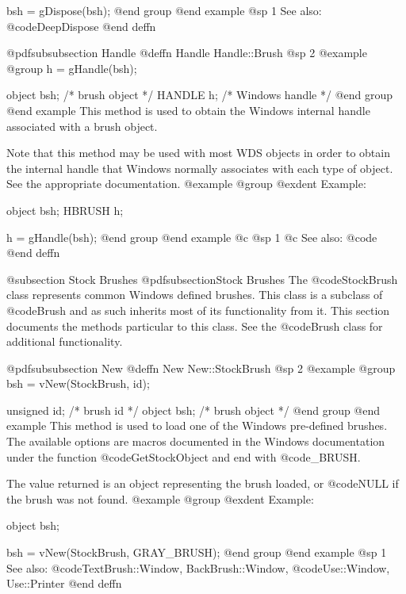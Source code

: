 bsh = gDispose(bsh);
@end group
@end example
@sp 1
See also:  @code{DeepDispose}
@end deffn






@pdfsubsubsection {Handle}
@deffn {Handle} Handle::Brush
@sp 2
@example
@group
h = gHandle(bsh);

object  bsh;    /*  brush object    */
HANDLE  h;      /*  Windows handle  */
@end group
@end example
This method is used to obtain the Windows internal handle associated with
a brush object.  

Note that this method may be used with most WDS objects in order to obtain
the internal handle that Windows normally associates with each type of object.
See the appropriate documentation.
@example
@group
@exdent Example:

object  bsh;
HBRUSH  h;

h = gHandle(bsh);
@end group
@end example
@c @sp 1
@c See also:  @code{}
@end deffn








@subsection Stock Brushes
@pdfsubsection{Stock Brushes}
The @code{StockBrush} class represents common Windows defined brushes.  This
class is a subclass of @code{Brush} and as such inherits most of its
functionality from it.  This section documents the methods particular to
this class.  See the @code{Brush} class for additional functionality.






@pdfsubsubsection {New}
@deffn {New} New::StockBrush
@sp 2
@example
@group
bsh = vNew(StockBrush, id);

unsigned id;    /*  brush id      */
object  bsh;    /*  brush object  */
@end group
@end example
This method is used to load one of the Windows pre-defined brushes.
The available options are macros documented in the Windows documentation
under the function @code{GetStockObject} and end with @code{_BRUSH}.

The value returned is an object representing the brush loaded, or
@code{NULL} if the brush was not found.
@example
@group
@exdent Example:

object  bsh;

bsh = vNew(StockBrush, GRAY_BRUSH);
@end group
@end example
@sp 1
See also:  @code{TextBrush::Window, BackBrush::Window,}
        @code{Use::Window, Use::Printer}
@end deffn









